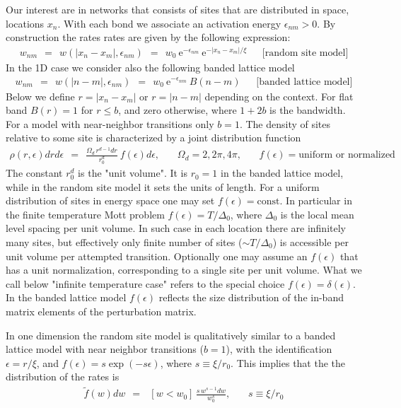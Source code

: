 \documentclass[onecolumn,fleqn,notitlepage,secnumarabic]{revtex4}
\newcommand{\const}{\mbox{const}}
\newcommand{\eexp}{\mbox{e}^}
\newcommand{\beq}{\begin{eqnarray}}
\newcommand{\eeq}{\end{eqnarray}}
\begin{document}
Our interest are in networks that consists of sites 
that are distributed in space, locations $x_n$.
With each bond we associate an activation energy $\epsilon_{nm}>0$. 
By construction the rates rates are given by the following expression:
%
\beq
w_{nm} \ \ = \ \  w(|x_n-x_m|,\epsilon_{nm})  \ \ = \ \  w_0 \ \eexp{-\epsilon_{nm}} \ \eexp{-|x_n-x_m|/\xi} 
\ \ \ \ \ \ \ \mbox{[random site model]}
\eeq
%
In the 1D case we consider also the following banded lattice model
%
\beq
w_{nm} \ \ = \ \  w(|n-m|,\epsilon_{nm})  \ \ = \ \  w_0 \ \eexp{-\epsilon_{nm}} \ B(n-m)
\ \ \ \ \ \ \ \mbox{[banded lattice model]}
\eeq
% 
Below we define $r=|x_n-x_m|$ or $r=|n-m|$ depending on the context.
For flat band $B(r)=1$ for ${r \leq b}$, and zero otherwise,  
where $1{+}2b$ is the bandwidth. For a model with near-neighbor transitions only $b=1$.
The density of sites relative to some site is characterized  by a joint distribution function 
%
\beq
\rho(r,\epsilon)drd\epsilon \ \ = \ \ \frac{\Omega_d \, r^{d-1}dr}{r_0^{d}} \ f(\epsilon)d\epsilon,     
\ \ \ \ \ \ \ \ \Omega_d=2,2\pi,4\pi, \ \ \ \ \ \ \ \ f(\epsilon)=\mbox{uniform or normalized}
\eeq
%
The constant $r_0^d$ is the "unit volume". 
It is ${r_0=1}$ in the banded lattice model, 
while in the random site model it sets the units of length.
%  
For a uniform distribution of sites in energy space one may set ${f(\epsilon)=\const}$.
In particular in the finite temperature Mott problem ${f(\epsilon)= T/\Delta_0}$,  
where $\Delta_0$ is the local mean level spacing per unit volume.
In such case in each location there are infinitely many sites, 
but effectively only finite number of sites ($\sim T/\Delta_0$) 
is accessible per unit volume per attempted transition.  
Optionally one may assume an $f(\epsilon)$ that has a unit normalization, 
corresponding to a single site per unit volume. 
What we call below "infinite temperature case" refers to 
the special choice $f(\epsilon)=\delta(\epsilon)$. 
In the banded lattice model $f(\epsilon)$ reflects the size distribution 
of the in-band matrix elements of the perturbation matrix. 

In one dimension the random site model is qualitatively similar 
to a banded lattice model with near neighbor transitions (${b=1}$),
with the identification $\epsilon=r/\xi$,   
and $f(\epsilon) = s\exp(-s\epsilon)$, where $s \equiv \xi/r_0$. 
This implies that the the distribution of the rates is 
%
\beq
\tilde{f}(w) dw  \ \  =  \ \    \ [w < w_0] \, \frac{s \, w^{s-1} dw}{w_0^s}, 
\ \ \ \ \ \ \ \ s \equiv \xi/r_0
\eeq
\end{document}
